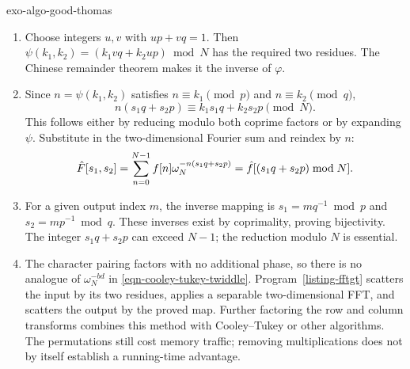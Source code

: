 \begin{correction}{exo-algo-good-thomas}
\begin{enumerate}
\item Choose integers $u,v$ with $up+vq=1$. Then
$\psi(k_1,k_2)=(k_1vq+k_2up)\bmod N$ has the required two residues.
The Chinese remainder theorem makes it the inverse of $\varphi$.
\item Since $n=\psi(k_1,k_2)$ satisfies $n\equiv k_1\pmod p$ and
$n\equiv k_2\pmod q$,
\[
 n(s_1q+s_2p)\equiv k_1s_1q+k_2s_2p\pmod N.
\]
This follows either by reducing modulo both coprime factors or by expanding
$\psi$. Substitute in the two-dimensional Fourier sum and reindex by $n$:
\[
 \hat{F}[s_1,s_2]
 =\sum_{n=0}^{N-1}f[n]\omega_N^{-n(s_1q+s_2p)}
 =\hat{f}[(s_1q+s_2p)\bmod N].
\]
\item For a given output index $m$, the inverse mapping is
$s_1=mq^{-1}\bmod p$ and $s_2=mp^{-1}\bmod q$.
These inverses exist by coprimality, proving bijectivity.
The integer $s_1q+s_2p$ can exceed $N-1$; the reduction modulo $N$ is essential.
\item The character pairing factors with no additional phase, so there is
no analogue of $\omega_N^{-bd}$ in \eqref{eqn-cooley-tukey-twiddle}.
Program~\ref{listing-fftgt} scatters the input by its two residues, applies
a separable two-dimensional FFT, and scatters the output by the proved map.
Further factoring the row and column transforms combines this method with
Cooley--Tukey or other algorithms. The permutations still cost memory traffic;
removing multiplications does not by itself establish a running-time advantage.
\begin{listing}[H]
\caption{A Good--Thomas factorization with explicit input and output permutations.}
\label{listing-fftgt}
\end{listing}
\end{enumerate}
\end{correction}

